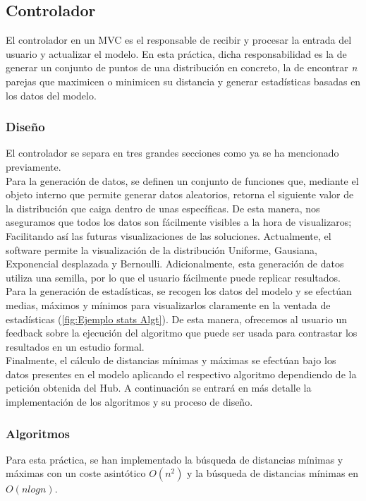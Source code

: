 \subsection{Controlador}
El controlador en un MVC es el responsable de recibir y procesar la entrada del usuario y actualizar el modelo. En esta práctica, dicha responsabilidad es la de generar un conjunto de puntos de una distribución en concreto, la de encontrar \textit{n} parejas que maximicen o minimicen su distancia y generar estadísticas basadas en los datos del modelo.

\subsubsection{Diseño}
El controlador se separa en tres grandes secciones como ya se ha mencionado previamente. \\

Para la generación de datos, se definen un conjunto de funciones que, mediante el objeto interno que permite generar datos aleatorios, retorna el siguiente valor de la distribución que caiga dentro de unas  específicas. De esta manera, nos aseguramos que todos los datos son fácilmente visibles a la hora de visualizaros; Facilitando así las futuras visualizaciones de las soluciones. Actualmente, el software permite la visualización de la distribución Uniforme, Gausiana, Exponencial desplazada y Bernoulli. Adicionalmente, esta generación de datos utiliza una semilla, por lo que el usuario fácilmente puede replicar resultados. \\

Para la generación de estadísticas, se recogen los datos del modelo y se efectúan medias, máximos y mínimos para visualizarlos claramente en la ventada de estadísticas (\ref{fig:Ejemplo stats Algt}). De esta manera, ofrecemos al usuario un feedback sobre la ejecución del algoritmo que puede ser usada para contrastar los resultados en un estudio formal.\\

Finalmente, el cálculo de distancias mínimas y máximas se efectúan bajo los datos presentes en el modelo aplicando el respectivo algoritmo dependiendo de la petición obtenida del Hub. A continuación se entrará en más detalle la implementación de los algoritmos y su proceso de diseño.

\subsubsection{Algoritmos}
Para esta práctica, se han implementado la búsqueda de distancias mínimas y máximas con un coste asintótico $O(n^2)$ y la búsqueda de distancias mínimas en $O(nlogn)$.\\

